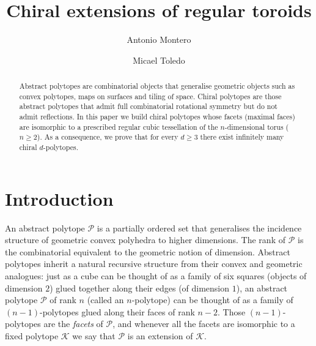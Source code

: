 \documentclass[final]{amsart}
\theoremstyle{plain}
\theoremstyle{definition}
\theoremstyle{remark}
\numberwithin{equation}{section}
\renewcommand{\{}{\lbrace}
\renewcommand{\}}{\rbrace}
\newcommand{\cK}{\mathcal{K}}
\newcommand{\cP}{\mathcal{P}}
\begin{document}
\title{Chiral extensions of regular toroids}



\author{Antonio Montero}
\address[a]{Faculty of Mathematics and Physics, University of Ljubljana, SI-1000 Ljubljana, Slovenia}

\author{Micael Toledo} 
\address[b]{Institute of Mathematics, Physics and Mechanics, Jadranska 19, SI-1000
Ljubljana, Slovenia}






\begin{abstract}
    Abstract polytopes are combinatorial objects that generalise geometric objects such as convex polytopes, maps on surfaces and tiling of space. Chiral polytopes are those abstract polytopes that admit full combinatorial rotational symmetry but do not admit reflections. 
    In this paper we build chiral polytopes whose facets (maximal faces) are isomorphic to a prescribed regular cubic tessellation of the $n$-dimensional torus ($n \geq 2$). 
    As a consequence, we prove that for every $d \geq 3$ there exist infinitely many chiral $d$-polytopes.
\end{abstract}
 


\maketitle 

\listoftodos\relax




\section{Introduction}

An abstract polytope $\cP$ is a partially ordered set that generalises the incidence structure of geometric convex polyhedra to higher dimensions. The rank of $\cP$ is the combinatorial equivalent to the geometric notion of dimension.
Abstract polytopes inherit a natural recursive structure from their convex and geometric analogues: just as a cube can be thought of as a family of six squares (objects of dimension $2$) glued together along their edges (of dimension $1$), an abstract polytope $\cP$ of rank $n$ (called an $n$-polytope) can be thought of as a family of $(n-1)$-polytopes glued along 
 their faces of rank $n-2$. 
Those $(n-1)$-polytopes are the \emph{facets} of $\cP$, and whenever all the facets are {isomorphic} to a fixed polytope $\cK$ we say that $\cP$ is an extension of $\cK$.
\end{document}
